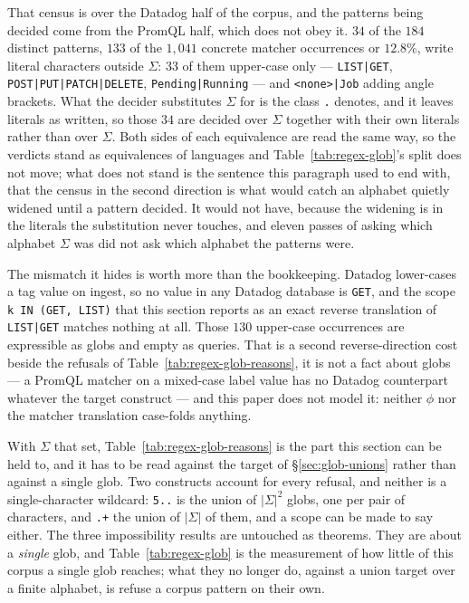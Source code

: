 That census is over the Datadog half of the corpus, and the patterns being decided come
from the PromQL half, which does not obey it. $34$ of the $184$ distinct patterns, $133$
of the $1{,}041$ concrete matcher occurrences or $12.8\%$, write literal characters
outside $\Sigma$: $33$ of them upper-case only --- \texttt{LIST|GET},
\texttt{POST|PUT|PATCH|DELETE}, \texttt{Pending|Running} --- and \texttt{<none>|Job}
adding angle brackets. What the decider substitutes $\Sigma$ for
is the class \texttt{.} denotes, and it leaves literals as written, so those $34$ are
decided over $\Sigma$ together with their own literals rather than over $\Sigma$. Both
sides of each equivalence are read the same way, so the verdicts stand as equivalences
of languages and Table~\ref{tab:regex-glob}'s split does not move; what does not stand
is the sentence this paragraph used to end with, that the census in the second direction
is what would catch an alphabet quietly widened until a pattern decided. It would not
have, because the widening is in the literals the substitution never touches, and eleven
passes of asking which alphabet $\Sigma$ was did not ask which alphabet the patterns
were.

The mismatch it hides is worth more than the bookkeeping. Datadog lower-cases a tag
value on ingest, so no value in any Datadog database is \texttt{GET}, and the scope
\texttt{k IN (GET, LIST)} that this section reports as an exact reverse translation of
\texttt{LIST|GET} matches nothing at all. Those $130$ upper-case occurrences are
expressible as globs and empty as queries. That is a second reverse-direction cost
beside the refusals of Table~\ref{tab:regex-glob-reasons}, it is not a fact about globs
--- a PromQL matcher on a mixed-case label value has no Datadog counterpart whatever the
target construct --- and this paper does not model it: neither $\phi$ nor the matcher
translation case-folds anything.

With $\Sigma$ that set, Table~\ref{tab:regex-glob-reasons} is the part this section can
be held to, and it has to be read against the target of \S\ref{sec:glob-unions} rather
than against a single glob. Two constructs account for every refusal, and neither is a
single-character wildcard: \texttt{5..} is the union of $|\Sigma|^{2}$ globs, one per
pair of characters, and \texttt{.+} the union of $|\Sigma|$ of them, and a scope can be
made to say either. The three impossibility results are untouched as theorems. They are
about a \emph{single} glob, and Table~\ref{tab:regex-glob} is the measurement of how
little of this corpus a single glob reaches; what they no longer do, against a union
target over a finite alphabet, is refuse a corpus pattern on their own.

